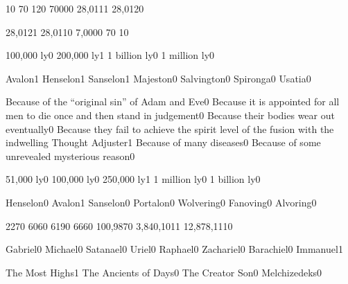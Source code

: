 
{1}{0}
{7}{0}
{12}{0}
{7000}{0}
{28,011}{1}
{28,012}{0}
\qstop

{28,012}{1}
{28,011}{0}
{7,000}{0}
{7}{0}
{1}{0}
\qstop


{100,000 ly}{0}
{200,000 ly}{1}
{1 billion ly}{0}
{1 million ly}{0}
\qstop

{Avalon}{1}
{Henselon}{1}
{Sanselon}{1}
{Majeston}{0}
{Salvington}{0}
{Spironga}{0}
{Usatia}{0}
\qstop

{Because of the ``original sin'' of Adam and Eve}{0}
{Because it is appointed for all men to die once and then stand in judgement}{0}
{Because their bodies wear out eventually}{0}
{Because they fail to achieve the spirit level of the fusion with the indwelling Thought Adjuster}{1}
{Because of many diseases}{0}
{Because of some unrevealed mysterious reason}{0}
\qstop

{51,000 ly}{0}
{100,000 ly}{0}
{250,000 ly}{1}
{1 million ly}{0}
{1 billion ly}{0}
\qstop

{Henselon}{0}
{Avalon}{1}
{Sanselon}{0}
{Portalon}{0}
{Wolvering}{0}
{Fanoving}{0}
{Alvoring}{0}
\qstop

{227}{0}
{606}{0}
{619}{0}
{666}{0}
{100,987}{0}
{3,840,101}{1}
{12,878,111}{0}
\qstop


{Gabriel}{0}
{Michael}{0}
{Satanael}{0}
{Uriel}{0}
{Raphael}{0}
{Zachariel}{0}
{Barachiel}{0}
{Immanuel}{1}
\qstop

{The Most Highs}{1}
{The Ancients of Days}{0}
{The Creator Son}{0}
{Melchizedeks}{0}
\qstop

